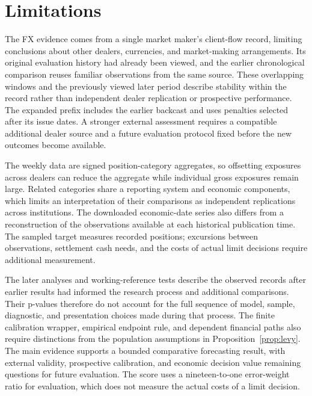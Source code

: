\documentclass[11pt,a4paper]{article}
\begin{document}
\FloatBarrier

\section{Limitations}\label{sec:limitations}

The FX evidence comes from a single market maker's client-flow record, limiting conclusions about other dealers, currencies, and market-making arrangements. Its original evaluation history had already been viewed, and the earlier chronological comparison reuses familiar observations from the same source. These overlapping windows and the previously viewed later period describe stability within the record rather than independent dealer replication or prospective performance. The expanded prefix includes the earlier backcast and uses penalties selected after its issue dates. A stronger external assessment requires a compatible additional dealer source and a future evaluation protocol fixed before the new outcomes become available.


The weekly data are signed position-category aggregates, so offsetting exposures across dealers can reduce the aggregate while individual gross exposures remain large. Related categories share a reporting system and economic components, which limits an interpretation of their comparisons as independent replications across institutions. The downloaded economic-date series also differs from a reconstruction of the observations available at each historical publication time. The sampled target measures recorded positions; excursions between observations, settlement cash needs, and the costs of actual limit decisions require additional measurement.


The later analyses and working-reference tests describe the observed records after earlier results had informed the research process and additional comparisons. Their p-values therefore do not account for the full sequence of model, sample, diagnostic, and presentation choices made during that process. The finite calibration wrapper, empirical endpoint rule, and dependent financial paths also require distinctions from the population assumptions in Proposition~\ref{prop:levy}. The main evidence supports a bounded comparative forecasting result, with external validity, prospective calibration, and economic decision value remaining questions for future evaluation. The score uses a nineteen-to-one error-weight ratio for evaluation, which does not measure the actual costs of a limit decision.
\end{document}

